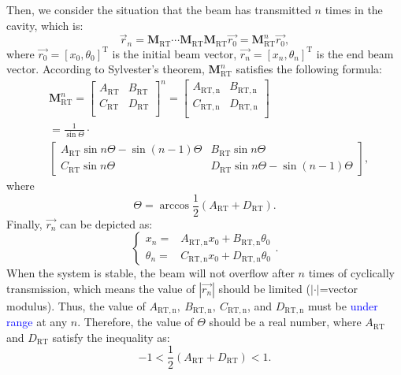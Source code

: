 \documentclass{IEEEtran}
\begin{document}
Then, we consider the situation that the beam has transmitted $n$ times in the cavity, which is:
\begin{equation}\label{tx}
\vec{r}_{n} = \mathbf{M}_\mathrm{RT}\cdots \mathbf{M}_\mathrm{RT}\mathbf{M}_\mathrm{RT} \vec{r_0}=\mathbf{M}^n_\mathrm{RT}\vec{r_0},
\end{equation}
where $\vec{r_0}=[x_0,\theta_0]^\mathrm{T}$ is the initial beam vector, $\vec{r_n}=[x_n,\theta_n]^\mathrm{T}$ is the end beam vector.
According to Sylvester's theorem, $\mathbf{M}^n_\mathrm{RT}$ satisfies the following formula:
\begin{equation}
\begin{aligned}
&\mathbf{M}^n_\mathrm{RT}=
\left[ \begin{array}{cc}A_\mathrm{RT} & B_\mathrm{RT} \\C_\mathrm{RT} & D_\mathrm{RT} \\\end{array} \right ]^{n}
=
\left[ \begin{array}{cc}A_\mathrm{RT,n} & B_\mathrm{RT,n} \\C_\mathrm{RT,n} & D_\mathrm{RT,n} \\\end{array} \right ]
\\
&=\frac{1}{\sin \Theta}\cdot \\
&\left[\begin{array}{ll}
A_\mathrm{RT} \sin n \Theta-\sin (n-1) \Theta & B_\mathrm{RT} \sin n \Theta \\
C_\mathrm{RT} \sin n \Theta & D_\mathrm{RT} \sin n \Theta-\sin (n-1) \Theta
\end{array}\right],
\end{aligned}
\end{equation}
where 
\begin{equation}\label{theta}
    \Theta=\arccos\frac{1}{2}(A_\mathrm{RT}+D_\mathrm{RT}).
\end{equation}
Finally, $\vec{r_n}$ can be depicted as:
\begin{equation}
\left\{
\begin{aligned}
x_n=&A_\mathrm{RT,n}x_0+B_\mathrm{RT,n}\theta_0\\
\theta_n=&C_\mathrm{RT,n}x_0+D_\mathrm{RT,n}\theta_0
\end{aligned} 
\right..
\end{equation}
When the system is stable, the beam will not overflow after $n$ times of cyclically transmission, which means the value of $|\vec{r_n}|$ should be limited ($|\cdot|$=vector modulus). Thus, the value of $A_\mathrm{RT,n},~B_\mathrm{RT,n},~C_\mathrm{RT,n}$, and $D_\mathrm{RT,n}$ must be \textcolor{blue}{under range} at any $n$. Therefore, the value of $\Theta$ should be a real number, where $A_\mathrm{RT}$ and $D_\mathrm{RT}$ satisfy the inequality as:
\begin{equation}\label{STcondition}
    -1<\frac{1}{2}(A_\mathrm{RT}+D_\mathrm{RT})<1.
\end{equation}
\end{document}
